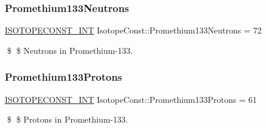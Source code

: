 \subsubsection{\texorpdfstring{Promethium133\+Neutrons}{Promethium133Neutrons}}
{\footnotesize\ttfamily \mbox{\hyperlink{group___isotope_const-_macros_ga5f18360b3e99483a35c32d789e62621c}{I\+S\+O\+T\+O\+P\+E\+C\+O\+N\+S\+T\+\_\+\+I\+NT}} Isotope\+Const\+::\+Promethium133\+Neutrons = 72}

\$ \$ Neutrons in Promethium-\/133. \mbox{\label{group___isotope_const-_promethium-_pm133_gaf336096aca9bbeff1fc497a86f76d8c7}} 
\subsubsection{\texorpdfstring{Promethium133\+Protons}{Promethium133Protons}}
{\footnotesize\ttfamily \mbox{\hyperlink{group___isotope_const-_macros_ga5f18360b3e99483a35c32d789e62621c}{I\+S\+O\+T\+O\+P\+E\+C\+O\+N\+S\+T\+\_\+\+I\+NT}} Isotope\+Const\+::\+Promethium133\+Protons = 61}

\$ \$ Protons in Promethium-\/133. 